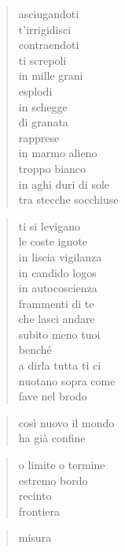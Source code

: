 \vspace*{2cm}

	\begin{verse}
		asciugandoti\\
		t’irrigidisci\\
		contraendoti\\
		ti screpoli\\
		in mille grani\\
		esplodi\\
		in schegge\\
		di granata\\
		rapprese\\
		in marmo alieno\\
		troppo bianco\\
		in aghi duri di sole\\
		tra stecche socchiuse
	\end{verse}

	\begin{verse}
		ti si levigano\\
		le coste ignote\\
		in liscia vigilanza\\
		in candido logos\\
		in autocoscienza\\
		frammenti di te\\
		che lasci andare\\
		subito meno tuoi\\
		benché\\
		a dirla tutta ti ci\\
		nuotano sopra come\\
		fave nel brodo
	\end{verse}

\clearpage


\vspace*{2cm}

	\begin{verse}
		così nuovo il mondo\\
		ha già confine
	\end{verse}

	\begin{verse}
		o limite o termine\\
		estremo bordo\\
		recinto\\
		frontiera
	\end{verse}

	\begin{verse}
		misura
	\end{verse}

